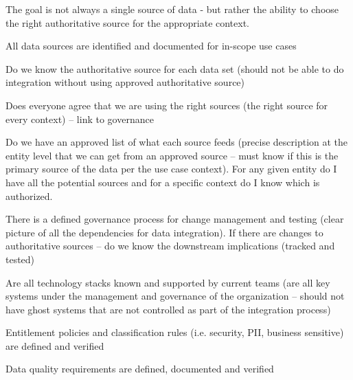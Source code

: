 \kgmmcorequestionssection

The goal is not always a single source of data - but rather the ability to choose the right authoritative source
for the appropriate context.

\kgmmscoringlevelOne

\begin{scoring}

    \item All data sources are identified and documented for in-scope use cases
    \item Do we know the authoritative source for each data set (should not be able to do integration without
          using approved authoritative source)
    \item Does everyone agree that we are using the right sources (the right source for every context) --
          link to governance
    \item Do we have an approved list of what each source feeds (precise description at the entity level that
          we can get from an approved source -- must know if this is the primary source of the data per the
          use case context).
          For any given entity do I have all the potential sources and for a specific context do I know which
          is authorized.
    \item There is a defined governance process for change management and testing (clear picture of all the
          dependencies for data integration).
          If there are changes to authoritative sources -- do we know the downstream implications (tracked and tested)
    \item Are all technology stacks known and supported by current teams (are all key systems under the
          management and governance of the organization -- should not have ghost systems that are not controlled
          as part of the integration process)
    \item Entitlement policies and classification rules (i.e. security, PII, business sensitive) are
          defined and verified
    \item Data quality requirements are defined, documented and verified

\end{scoring}

\kgmmscoringlevelTwo

